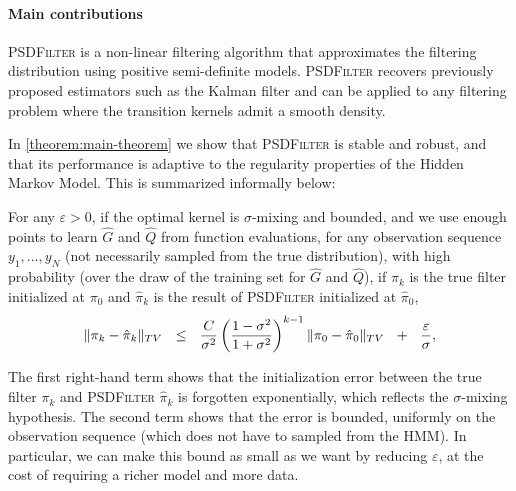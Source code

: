 \paragraph{Main contributions}
\textsc{PSDFilter} is a non-linear filtering algorithm that approximates the filtering distribution using positive semi-definite models. \textsc{PSDFilter} recovers previously proposed estimators such as the Kalman filter and can be applied to any filtering problem where the transition kernels admit a smooth density.

In \cref{theorem:main-theorem} we show that \textsc{PSDFilter} is stable and robust, and that its performance is adaptive to the regularity properties of the Hidden Markov Model. This is summarized informally below:
\begin{mdframed}
\begin{informaltheorem}
For any $\varepsilon > 0$, if the optimal kernel is $\sigma$-mixing and bounded, and we use enough points to learn $\hat G$ and $\hat Q$ from function evaluations, for any observation sequence $y_1, \ldots, y_N$ (not necessarily sampled from the true distribution), with high probability (over the draw of the training set for $\hat G$ and $\hat Q$), if $\pi_k$ is the true filter initialized at $\pi_0$ and $\hat \pi_k$ is the result of \textsc{PSDFilter} initialized at $\hat \pi_0$,
\begin{align*}
    \Vert \pi_k - \hat\pi_k\Vert_{TV} ~~\leq~~ \frac{C}{\sigma^2}\left(\frac{1-\sigma^2}{1 + \sigma^2}\right)^{k-1}\|\pi_0 - \hat{\pi}_0\|_{TV} ~~+~~ \frac{\varepsilon}{\sigma},
\end{align*}
\end{informaltheorem}
\end{mdframed}
The first right-hand term shows that the initialization error between the true filter $\pi_k$ and \textsc{PSDFilter} $\hat \pi_k$ is forgotten exponentially, which reflects the $\sigma$-mixing hypothesis. The second term shows that the error is bounded, uniformly on the observation sequence (which does not have to sampled from the HMM). In particular, we can make this bound as small as we want by reducing $\varepsilon$, at the cost of requiring a richer model and more data.

